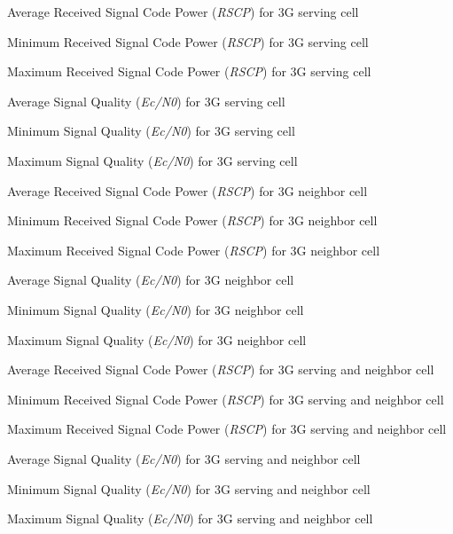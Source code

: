 %
{Average Received Signal Code Power (\textit{RSCP}) for 3G serving cell}

%
{Minimum Received Signal Code Power (\textit{RSCP}) for 3G serving cell}

%
{Maximum Received Signal Code Power (\textit{RSCP}) for 3G serving cell}


%
{Average Signal Quality (\textit{Ec/N0}) for 3G serving cell}

%
{Minimum Signal Quality (\textit{Ec/N0}) for 3G serving cell}

%
{Maximum Signal Quality (\textit{Ec/N0}) for 3G serving cell}


%
{Average Received Signal Code Power (\textit{RSCP}) for 3G neighbor cell}

%
{Minimum Received Signal Code Power (\textit{RSCP}) for 3G neighbor cell}

%
{Maximum Received Signal Code Power (\textit{RSCP}) for 3G neighbor cell}


%
{Average Signal Quality (\textit{Ec/N0}) for 3G neighbor cell}

%
{Minimum Signal Quality (\textit{Ec/N0}) for 3G neighbor cell}

%
{Maximum Signal Quality (\textit{Ec/N0}) for 3G neighbor cell}


%
{Average Received Signal Code Power (\textit{RSCP}) for 3G serving and neighbor cell}

%
{Minimum Received Signal Code Power (\textit{RSCP}) for 3G serving and neighbor cell}

%
{Maximum Received Signal Code Power (\textit{RSCP}) for 3G serving and neighbor cell}


%
{Average Signal Quality (\textit{Ec/N0}) for 3G serving and neighbor cell}

%
{Minimum Signal Quality (\textit{Ec/N0}) for 3G serving and neighbor cell}

%
{Maximum Signal Quality (\textit{Ec/N0}) for 3G serving and neighbor cell}

